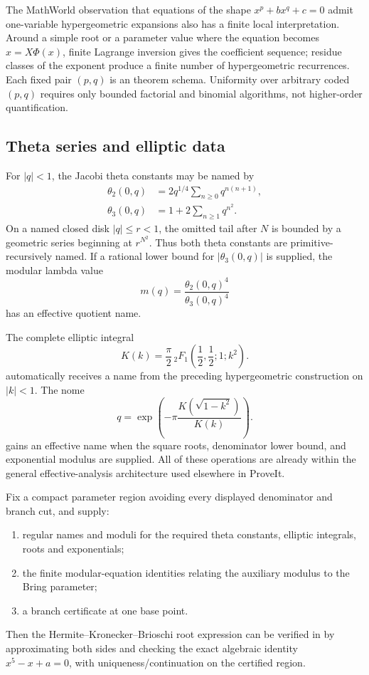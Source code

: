 The MathWorld observation that equations of the shape
\(x^p+bx^q+c=0\) admit one-variable hypergeometric expansions also has a
finite local interpretation.  Around a simple root or a parameter value where
the equation becomes \(x=X\Phi(x)\), finite Lagrange inversion gives the
coefficient sequence; residue classes of the exponent produce a finite number
of hypergeometric recurrences.  Each fixed pair \((p,q)\) is an \ipra{} theorem
schema.  Uniformity over arbitrary coded \((p,q)\) requires only bounded
factorial and binomial algorithms, not higher-order quantification.

\subsection{Theta series and elliptic data}

For \(|q|<1\), the Jacobi theta constants may be named by
\begin{align*}
 \theta_2(0,q)&=2q^{1/4}\sum_{n\ge0}q^{n(n+1)},\\
 \theta_3(0,q)&=1+2\sum_{n\ge1}q^{n^2}.
\end{align*}
On a named closed disk \(|q|\le r<1\), the omitted tail after \(N\) is bounded
by a geometric series beginning at \(r^{N^2}\).  Thus both theta constants are
primitive-recursively named.  If a rational lower bound for
\(|\theta_3(0,q)|\) is supplied, the modular lambda value
\begin{equation}\label{eq:lambda-theta}
 m(q)=\frac{\theta_2(0,q)^4}{\theta_3(0,q)^4}
\end{equation}
has an effective quotient name.

The complete elliptic integral
\[
 K(k)=\frac\pi2\,{}_2F_1\!\left(\frac12,\frac12;1;k^2\right).
\]
automatically receives a name from the preceding hypergeometric construction
on \(|k|<1\).  The nome
\[
 q=\exp\!\left(-\pi\frac{K(\sqrt{1-k^2})}{K(k)}\right).
\]
gains an effective name when the square roots, denominator lower bound, and
exponential modulus are supplied.  All of these operations are already within
the general effective-analysis architecture used elsewhere in ProveIt.

\begin{theorem}
\label{thm:hermite-interface}
Fix a compact parameter region avoiding every displayed denominator and branch
cut, and supply:
\begin{enumerate}
\item regular names and moduli for the required theta constants, elliptic
      integrals, roots and exponentials;
\item the finite modular-equation identities relating the auxiliary modulus to
      the Bring parameter;
\item a branch certificate at one base point.
\end{enumerate}
Then the Hermite--Kronecker--Brioschi root expression can be verified in
\ipra{} by approximating both sides and checking the exact algebraic identity
\(x^5-x+a=0\), with uniqueness/continuation on the certified region.
\end{theorem}

